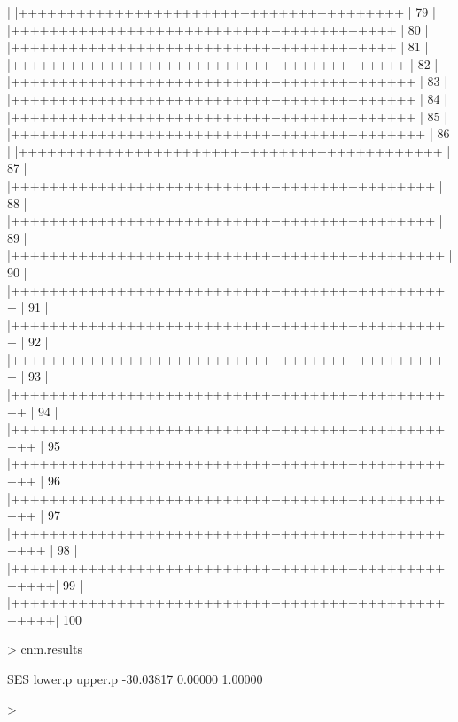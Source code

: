 \documentclass[12pt]{article}
\begin{document}
\begin{Schunk}
\begin{Soutput}
  |                                                        
  |++++++++++++++++++++++++++++++++++++++++          |  79%
  |                                                        
  |++++++++++++++++++++++++++++++++++++++++          |  80%
  |                                                        
  |++++++++++++++++++++++++++++++++++++++++          |  81%
  |                                                        
  |+++++++++++++++++++++++++++++++++++++++++         |  82%
  |                                                        
  |++++++++++++++++++++++++++++++++++++++++++        |  83%
  |                                                        
  |++++++++++++++++++++++++++++++++++++++++++        |  84%
  |                                                        
  |++++++++++++++++++++++++++++++++++++++++++        |  85%
  |                                                        
  |+++++++++++++++++++++++++++++++++++++++++++       |  86%
  |                                                        
  |++++++++++++++++++++++++++++++++++++++++++++      |  87%
  |                                                        
  |++++++++++++++++++++++++++++++++++++++++++++      |  88%
  |                                                        
  |++++++++++++++++++++++++++++++++++++++++++++      |  89%
  |                                                        
  |+++++++++++++++++++++++++++++++++++++++++++++     |  90%
  |                                                        
  |++++++++++++++++++++++++++++++++++++++++++++++    |  91%
  |                                                        
  |++++++++++++++++++++++++++++++++++++++++++++++    |  92%
  |                                                        
  |++++++++++++++++++++++++++++++++++++++++++++++    |  93%
  |                                                        
  |+++++++++++++++++++++++++++++++++++++++++++++++   |  94%
  |                                                        
  |++++++++++++++++++++++++++++++++++++++++++++++++  |  95%
  |                                                        
  |++++++++++++++++++++++++++++++++++++++++++++++++  |  96%
  |                                                        
  |++++++++++++++++++++++++++++++++++++++++++++++++  |  97%
  |                                                        
  |+++++++++++++++++++++++++++++++++++++++++++++++++ |  98%
  |                                                        
  |++++++++++++++++++++++++++++++++++++++++++++++++++|  99%
  |                                                        
  |++++++++++++++++++++++++++++++++++++++++++++++++++| 100%
\end{Soutput}
\begin{Sinput}
> cnm.results
\end{Sinput}
\begin{Soutput}
      SES   lower.p   upper.p 
-30.03817   0.00000   1.00000 
\end{Soutput}
\begin{Sinput}
> 
\end{Sinput}
\end{Schunk}
\end{document}
